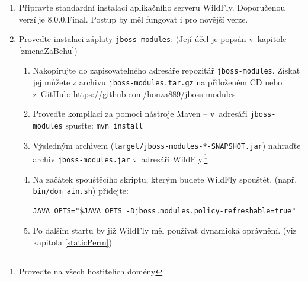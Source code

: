 \begin{enumerate}
  \item Připravte standardní instalaci aplikačního serveru WildFly. Doporučenou verzí je 8.0.0.Final. Postup by měl fungovat i pro novější verze.
  
  \item Proveďte instalaci záplaty {\tt jboss-modules}: (Její účel je popsán v~kapitole \ref{zmenaZaBehu})
  \begin{enumerate}
    \item Nakopírujte do zapisovatelného adresáře repozitář {\tt jboss-modules}. Získat jej můžete z archivu {\tt jboss-modules.tar.gz} na přiloženém CD nebo z~GitHub:
      \newline\url{https://github.com/honza889/jboss-modules}
    \item Proveďte kompilaci za pomoci nástroje Maven -- v~adresáři {\tt jboss-modules} spusťte: {\tt mvn install}
    \item Výsledným archivem ({\tt target/jboss-modules-*-SNAPSHOT.jar}) nahraďte archiv {\tt jboss-modules.jar} v~adresáři WildFly.\footnote{\label{slave}Proveďte na všech hostitelích domény}
    \item Na začátek spouštěcího skriptu, kterým budete WildFly spouštět, (např. {\tt bin/dom ain.sh}) přidejte:\footnotemark[1]
      \begin{lstlisting}
JAVA_OPTS="$JAVA_OPTS -Djboss.modules.policy-refreshable=true"
      \end{lstlisting}
    \item Po dalším startu by již WildFly měl používat dynamická oprávnění. (viz kapitola \ref{staticPerm})
  \end{enumerate}
  

\end{enumerate}
